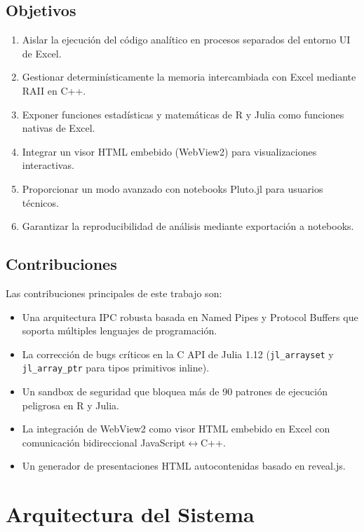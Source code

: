 \documentclass[12pt, a4paper]{report}
\begin{document}
\section{Objetivos}

\begin{enumerate}
    \item Aislar la ejecución del código analítico en procesos separados del entorno UI de Excel.
    \item Gestionar determinísticamente la memoria intercambiada con Excel mediante RAII en C++.
    \item Exponer funciones estadísticas y matemáticas de R y Julia como funciones nativas de Excel.
    \item Integrar un visor HTML embebido (WebView2) para visualizaciones interactivas.
    \item Proporcionar un modo avanzado con notebooks Pluto.jl para usuarios técnicos.
    \item Garantizar la reproducibilidad de análisis mediante exportación a notebooks.
\end{enumerate}

\section{Contribuciones}

Las contribuciones principales de este trabajo son:
\begin{itemize}
    \item Una arquitectura IPC robusta basada en Named Pipes y Protocol Buffers que soporta múltiples lenguajes de programación.
    \item La corrección de bugs críticos en la C API de Julia 1.12 (\texttt{jl\_arrayset} y \texttt{jl\_array\_ptr} para tipos primitivos inline).
    \item Un sandbox de seguridad que bloquea más de 90 patrones de ejecución peligrosa en R y Julia.
    \item La integración de WebView2 como visor HTML embebido en Excel con comunicación bidireccional JavaScript$\leftrightarrow$C++.
    \item Un generador de presentaciones HTML autocontenidas basado en reveal.js.
\end{itemize}

\chapter{Arquitectura del Sistema}
\end{document}
